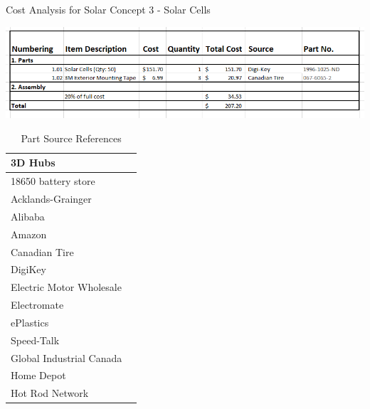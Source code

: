 \begin{table}[H]
  \caption{Cost Analysis for Solar Concept 3 - Solar Cells}
  \label{table:cost_solar_cells}
  \includegraphics[width=\linewidth]{Cost/S3.PNG}
\end{table}

\begin{center}
    \begin{longtable}{ l c }
        \caption{Part Source References}
        \label{table:source_reference}
         \\ \hline
          3D Hubs & \cite{3d_hubs_3d_nodate}
         \\ \hline
         18650 battery store & \cite{18650_battery_store_18650_nodate}
         \\
         Acklands-Grainger & \cite{acklands-grainger_acklands-grainger_nodate}
         \\ \hline
         Alibaba & \cite{alibaba_alibaba_nodate} 
         \\ \hline
         Amazon & \cite{amazon_amazon_nodate} 
         \\ \hline
         Canadian Tire & \cite{canadian_tire_canadian_nodate} 
         \\ \hline
         DigiKey & \cite{digikey_digikey_nodate} 
         \\ \hline
         Electric Motor Wholesale & \cite{electric_motor_wholesale_electric_nodate} 
         \\ \hline
         Electromate & \cite{electromate_electromate_nodate} 
         \\ \hline
         ePlastics & \cite{eplastics_eplastics_nodate} 
         \\ \hline
         Speed-Talk & \cite{speed-talk_finding_nodate} 
         \\ \hline
         Global Industrial Canada & \cite{global_industrial_canada_global_nodate} 
         \\ \hline
         Home Depot & \cite{home_depot_home_nodate} 
         \\ \hline
         Hot Rod Network & \cite{hot_rod_network_hot_nodate} 
         \\ \hline

\end{longtable}
\end{center}
